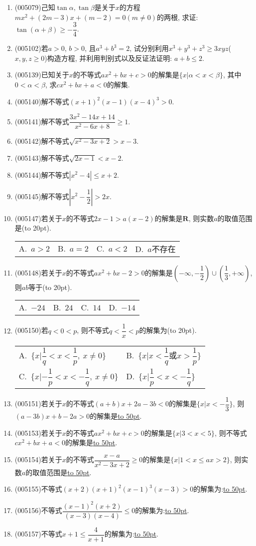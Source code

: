 \documentclass[10pt,a4paper]{article}
\newcommand{\blank}[1]{\underline{\hbox to #1pt{}}}
\newcommand{\bracket}[1]{(\hbox to #1pt{})}
\newcommand{\twoch}[4]{\par\begin{tabular}{p{.46\textwidth}p{.46\textwidth}}
A.~#1& B.~#2\\
C.~#3& D.~#4
\end{tabular}}
\newcommand{\fourch}[4]{\par\begin{tabular}{p{.23\textwidth}p{.23\textwidth}p{.23\textwidth}p{.23\textwidth}}
A.~#1 &B.~#2& C.~#3& D.~#4
\end{tabular}}
\begin{document}
\begin{enumerate}[1.]
\item {\tiny (005079)}己知$\tan \alpha,\tan \beta$是关于$x$的方程$mx^2+(2m-3)x+(m-2)=0(m\ne 0)$的两根, 求证: $\tan (\alpha +\beta)\ge -\dfrac 34$.
\item {\tiny (005102)}若$a>0$, $b>0$, 且$a^3+b^3=2$, 试分别利用$x^3+y^3+z^3\ge 3xyz$($x,y,z\ge 0$)构造方程, 并利用判别式以及反证法证明: $a+b\le 2$.
\item {\tiny (005139)}已知关于$x$的不等式$ax^2+bx+c>0$的解集是$\{x|\alpha<x<\beta\}$, 其中$0<\alpha<\beta$, 求$cx^2+bx+a<0$的解集.
\item {\tiny (005140)}解不等式$(x+1)^2(x-1)(x-4)^3>0$.
\item {\tiny (005141)}解不等式$\dfrac{3x^2-14x+14}{x^2-6x+8}\ge 1$.
\item {\tiny (005142)}解不等式$\sqrt{x^2-3x+2}>x-3$.
\item {\tiny (005143)}解不等式$\sqrt{2x-1}<x-2$.
\item {\tiny (005144)}解不等式$|x^2-4|\le x+2$.
\item {\tiny (005145)}解不等式$|x^2-\dfrac 12|>2x$.
\item {\tiny (005147)}若关于$x$的不等式$2x-1>a(x-2)$的解集是$\mathbf{R}$, 则实数$a$的取值范围是\bracket{20}.
\fourch{$a>2$}{$a=2$}{$a<2$}{$a$不存在}
\item {\tiny (005148)}若关于$x$的不等式$ax^2+bx-2>0$的解集是$(-\infty ,-\dfrac 12)\cup (\dfrac 13,+\infty)$, 则$ab$等于\bracket{20}.
\fourch{$-24$}{$24$}{$14$}{$-14$}
\item {\tiny (005150)}若$q<0<p$, 则不等式$q<\dfrac 1x<p$的解集为\bracket{20}.
\twoch{$\{x|\dfrac 1q<x<\dfrac 1p,\  x\ne 0\}$}{$\{x|x<\dfrac 1q\text{或}x>\dfrac 1p\}$}{$\{x|-\dfrac 1p<x<-\dfrac 1q, \ x\ne 0\}$}{$\{x|\dfrac 1p<x<-\dfrac 1q\}$}
\item {\tiny (005151)}若关于$x$的不等式$(a+b)x+2a-3b<0$的解集是$\{x|x<-\dfrac 13\}$, 则$(a-3b)x+b-2a>0$的解集是\blank{50}.
\item {\tiny (005153)}若关于$x$的不等式$ax^2+bx+c>0$的解集是$\{x|3<x<5\}$, 则不等式$cx^2+bx+a<0$的解集是\blank{50}.
\item {\tiny (005154)}若关于$x$的不等式$\dfrac{x-a}{x^2-3x+2}\ge 0$的解集是$\{x|1<x\le ax>2\}$, 则实数$a$的取值范围是\blank{50}.
\item {\tiny (005155)}不等式$(x+2)(x+1)^2(x-1)^3(x-3)>0$的解集为:\blank{50}.
\item {\tiny (005156)}不等式$\dfrac{(x-1)^2(x+2)}{(x-3)(x-4)}\le 0$的解集为:\blank{50}.
\item {\tiny (005157)}不等式$x+1\le \dfrac 4{x+1}$的解集为:\blank{50}.

\end{enumerate}
\end{document}
